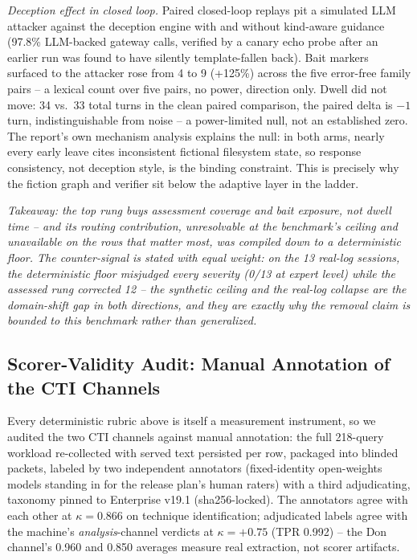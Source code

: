 \emph{Deception effect in closed loop.} Paired closed-loop replays pit a
simulated LLM attacker against the deception engine with and without
kind-aware guidance (97.8\% LLM-backed gateway calls, verified by a
canary echo probe after an earlier run was found to have silently
template-fallen back). Bait markers surfaced to the attacker rose from 4
to 9 (+125\%) across the five error-free family pairs -- a lexical count
over five pairs, no power, direction only. Dwell did not move: 34 vs.\
33 total turns in the clean paired comparison, the paired delta is
$-1$ turn, indistinguishable from noise -- a power-limited null, not an
established zero. The report's own mechanism analysis explains the null:
in both arms, nearly every early leave cites inconsistent fictional
filesystem state, so response consistency, not deception style, is the
binding constraint. This is precisely why the fiction graph and verifier
sit below the adaptive layer in the ladder.

\emph{Takeaway: the top rung buys assessment coverage and bait exposure,
not dwell time -- and its routing contribution, unresolvable at the
benchmark's ceiling and unavailable on the rows that matter most, was
compiled down to a deterministic floor. The counter-signal is stated
with equal weight: on the 13 real-log sessions, the deterministic floor
misjudged every severity (0/13 at expert level) while the assessed rung
corrected 12 -- the synthetic ceiling and the real-log collapse are the
domain-shift gap in both directions, and they are exactly why the
removal claim is bounded to this benchmark rather than generalized.}

\subsection{Scorer-Validity Audit: Manual Annotation of the CTI
Channels}
\label{sec:scorer-audit}

Every deterministic rubric above is itself a measurement instrument, so
we audited the two CTI channels against manual annotation: the full
218-query workload re-collected with served text persisted per row,
packaged into blinded packets, labeled by two independent annotators
(fixed-identity open-weights models standing in for the release plan's
human raters) with a third adjudicating, taxonomy pinned to \attck{}
Enterprise v19.1 (sha256-locked). The annotators agree with each other
at $\kappa = 0.866$ on technique identification; adjudicated labels
agree with the machine's \emph{analysis}-channel verdicts at
$\kappa = +0.75$ (TPR 0.992) -- the Don channel's 0.960 and 0.850
averages measure real extraction, not scorer artifacts.

